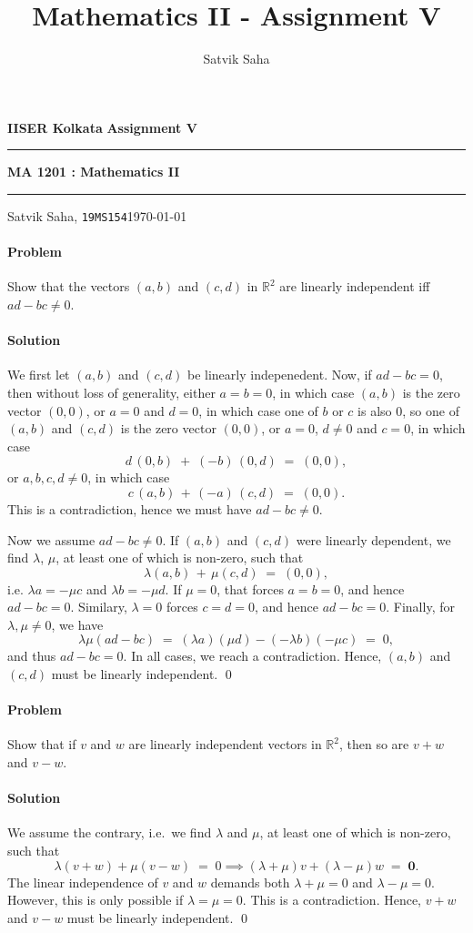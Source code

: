 \documentclass[10pt]{article}
\title{Mathematics II - Assignment V}
\author{Satvik Saha}
\date{}
\newcounter{prob}
\def\problem{\stepcounter{prob}\paragraph{Problem \arabic{prob}}}
\def\solution{\paragraph{Solution}}
\let\vec\mathbf
\begin{document}
        \par\textbf{IISER Kolkata} \hfill \textbf{Assignment V}
        \vspace{3pt}
        \hrule
        \vspace{3pt}
        \begin{center}
                \LARGE{\textbf{MA 1201 : Mathematics II}}
        \end{center}
        \vspace{3pt}
        \hrule
        \vspace{3pt}
        Satvik Saha, \texttt{19MS154}\hfill \today
        \vspace{20pt}
        
        \problem Show that the vectors $(a, b)$ and $(c, d)$ in $\mathbb{R}^2$ are linearly independent iff $ad - bc \neq 0$.
        \solution We first let $(a, b)$ and $(c, d)$ be linearly indepenedent. Now, if $ad - bc = 0$, then
        without loss of generality, either $a = b = 0$, in which case $(a, b)$ is the zero vector $(0, 0)$,
        or $a = 0$ and $d = 0$, in which case one of $b$ or $c$ is also $0$, so one of $(a, b)$ and $(c, d)$ is the zero vector $(0, 0)$,
        or $a = 0$, $d \neq 0$ and $c = 0$, in which case
        \[
               d \,(0, b) \;+\; (-b) \,(0, d) \;=\; (0, 0),
        \]
        or $a, b, c, d \neq 0$, in which case
        \[
                c\,(a, b) \,+\, (-a)\,(c, d) \;=\; (0, 0).
        \]
        This is a contradiction, hence we must have $ad - bc \neq 0$.

        Now we assume $ad - bc \neq 0$. If $(a, b)$ and $(c, d)$ were linearly dependent, we find $\lambda$, $\mu$, at least one of
        which is non-zero, such that
        \[
                \lambda (a, b) \,+\, \mu(c, d) \;=\; (0, 0),
        \]
        i.e. $\lambda a = - \mu c$ and $\lambda b = -\mu d$. If $\mu = 0$, that forces $a = b = 0$, and hence $ad - bc = 0$.
        Similary, $\lambda = 0$ forces $c = d = 0$, and hence $ad - bc = 0$.
        Finally, for $\lambda, \mu \neq 0$, we have
        \[
        \lambda\mu(ad - bc) \;=\; (\lambda a)(\mu d) - (-\lambda b)(-\mu c) \;=\; 0,
        \]
        and thus $ad - bc = 0$. In all cases, we reach a contradiction. Hence, $(a, b)$ and $(c, d)$ must be linearly independent. \qed

        \problem Show that if $v$ and $w$ are linearly independent vectors in $\mathbb{R}^2$, then so are $v + w$ and $v - w$.
        \solution We assume the contrary, i.e.\ we find $\lambda$ and $\mu$, at least one of which is non-zero, such that
        \[
                \lambda(v + w) + \mu(v - w) \;=\; 0 \implies (\lambda + \mu)v + (\lambda - \mu)w \;=\; \vec{0}.
        \]
        The linear independence of $v$ and $w$ demands both $\lambda + \mu = 0$ and $\lambda - \mu = 0$. However, 
        this is only possible if $\lambda = \mu = 0$. This is a contradiction. Hence, $v + w$ and $v - w$ must be linearly independent. \qed
\end{document}

